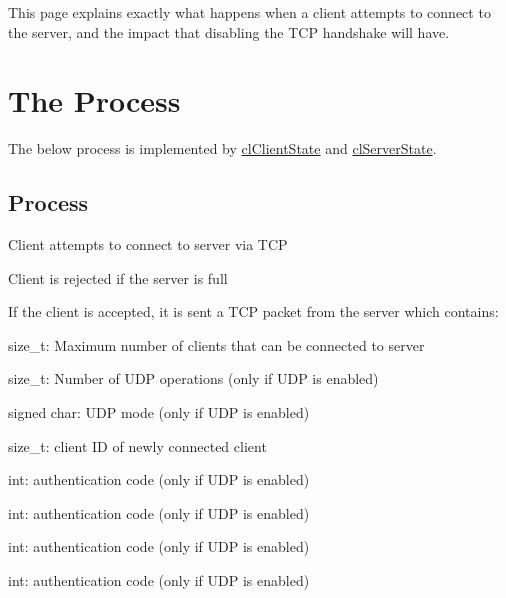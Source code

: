 This page explains exactly what happens when a client attempts to connect to the server, and the impact that disabling the TCP handshake will have.\par
\par
\hypertarget{handshakepage_handshakeProcess}{}\section{The Process}\label{handshakepage_handshakeProcess}
The below process is implemented by \hyperlink{classcl_client_state}{clClientState} and \hyperlink{classcl_server_state}{clServerState}. \par
\par
\hypertarget{handshakepage_handshakeProcessActual}{}\subsection{Process}\label{handshakepage_handshakeProcessActual}

\begin{DoxyItemize}
\item Client attempts to connect to server via TCP\par

\end{DoxyItemize}


\begin{DoxyItemize}
\item Client is rejected if the server is full
\item If the client is accepted, it is sent a TCP packet from the server which contains:
\begin{DoxyItemize}
\item size\_\-t: Maximum number of clients that can be connected to server
\item size\_\-t: Number of UDP operations (only if UDP is enabled)
\item signed char: UDP mode (only if UDP is enabled)
\item size\_\-t: client ID of newly connected client
\item int: authentication code (only if UDP is enabled)
\item int: authentication code (only if UDP is enabled)
\item int: authentication code (only if UDP is enabled)
\item int: authentication code (only if UDP is enabled)\par

\end{DoxyItemize}
\end{DoxyItemize}


